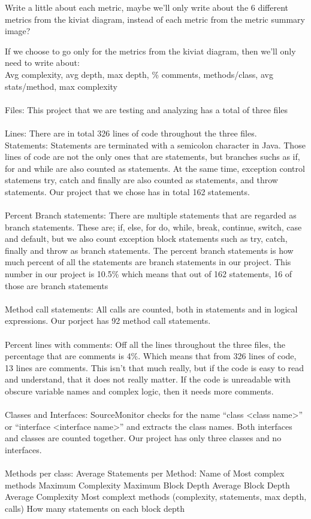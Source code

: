 \documentclass[UKenglish]{article}  %
\begin{document}
Write a little about each metric, maybe we'll only write about the 6 different metrics from the kiviat diagram, instead of each metric from the metric summary image?

If we choose to go only for the metrics from the kiviat diagram, then we'll only need to write about:\\
Avg complexity, avg depth, max depth, \% comments, methods/class, avg stats/method, max complexity\\\\
Files: This project that we are testing and analyzing has a total of three files\\\\
Lines: There are in total 326 lines of code throughout the three files. \\
Statements: Statements are terminated with a semicolon character in Java. Those lines of code are not the only ones that are statements, but branches suchs as if, for and while are also counted as statements. At the same time, exception control statemens try, catch and finally are also counted as statements, and throw statements. Our project that we chose has in total 162 statements. \\\\
Percent Branch statements: There are multiple statements that are regarded as branch statements. These are; if, else, for do, while, break, continue, switch, case and default, but we also count exception block statements such as try, catch, finally and throw as branch statements. The percent branch statements is how much percent of all the statements are branch statements in our project. This number in our project is 10.5\% which means that out of 162 statements, 16 of those are branch statements\\\\
Method call statements: All calls are counted, both in statements and in logical expressions. Our porject has 92 method call statements.\\\\
Percent lines with comments: Off all the lines throughout the three files, the percentage that are comments is 4\%. Which means that from 326 lines of code, 13 lines are comments. This isn't that much really, but if the code is easy to read and understand, that it does not really matter. If the code is unreadable with obscure variable names and complex logic, then it needs more comments. \\\\
Classes and Interfaces: SourceMonitor checks for the name ``class <class name>'' or ``interface <interface name>'' and extracts the class names. Both interfaces and classes are counted together. Our project has only three classes and no interfaces. \\\\ 
Methods per class: 
Average Statements per Method:
Name of Most complex methods
Maximum Complexity
Maximum Block Depth
Average Block Depth
Average Complexity
Most complext methods (complexity, statements, max depth, calls)
How many statements on each block depth
\end{document}
